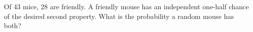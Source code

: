 Of 43 mice, 28 are friendly. A friendly mouse has an independent one-half chance of the desired second property. What is the probability a random mouse has both?
